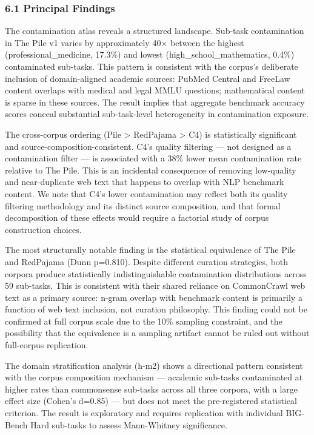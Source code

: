 
\subsubsection{6.1 Principal Findings}

The contamination atlas reveals a structured landscape. Sub-task contamination in The Pile v1 varies by approximately 40× between the highest (professional_medicine, 17.3\%) and lowest (high_school_mathematics, 0.4\%) contaminated sub-tasks. This pattern is consistent with the corpus's deliberate inclusion of domain-aligned academic sources: PubMed Central and FreeLaw content overlaps with medical and legal MMLU questions; mathematical content is sparse in these sources. The result implies that aggregate benchmark accuracy scores conceal substantial sub-task-level heterogeneity in contamination exposure.

The cross-corpus ordering (Pile > RedPajama > C4) is statistically significant and source-composition-consistent. C4's quality filtering — not designed as a contamination filter — is associated with a 38\% lower mean contamination rate relative to The Pile. This is an incidental consequence of removing low-quality and near-duplicate web text that happens to overlap with NLP benchmark content. We note that C4's lower contamination may reflect both its quality filtering methodology and its distinct source composition, and that formal decomposition of these effects would require a factorial study of corpus construction choices.

The most structurally notable finding is the statistical equivalence of The Pile and RedPajama (Dunn p=0.810). Despite different curation strategies, both corpora produce statistically indistinguishable contamination distributions across 59 sub-tasks. This is consistent with their shared reliance on CommonCrawl web text as a primary source: n-gram overlap with benchmark content is primarily a function of web text inclusion, not curation philosophy. This finding could not be confirmed at full corpus scale due to the 10\% sampling constraint, and the possibility that the equivalence is a sampling artifact cannot be ruled out without full-corpus replication.

The domain stratification analysis (h-m2) shows a directional pattern consistent with the corpus composition mechanism — academic sub-tasks contaminated at higher rates than commonsense sub-tasks across all three corpora, with a large effect size (Cohen's d=0.85) — but does not meet the pre-registered statistical criterion. The result is exploratory and requires replication with individual BIG-Bench Hard sub-tasks to assess Mann-Whitney significance.

